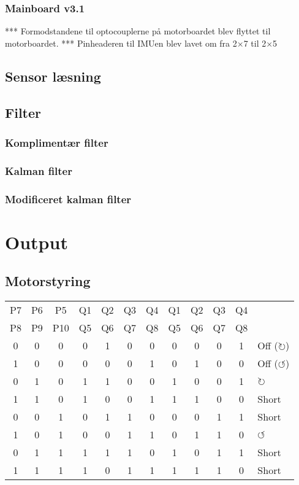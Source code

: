 \documentclass[a4paper,oneside,article,danish,table,draft]{memoir}
\begin{document}
\subsubsection{Mainboard v3.1}
*** Formodstandene til optocouplerne på motorboardet blev flyttet til motorboardet.
*** Pinheaderen til IMUen blev lavet om fra 2×7 til 2×5

\subsection{Sensor læsning}

\subsection{Filter}
\subsubsection{Komplimentær filter}
\subsubsection{Kalman filter}
\subsubsection{Modificeret kalman filter}

\section{Output}

\subsection{Motorstyring}
\begin{table}[htbp]
  \centering
  \begin{tabular}{ccc|cccc|ccccl}
      \toprule
     P7&P6&P5 &Q1&Q2&Q3&Q4 &Q1&Q2&Q3&Q4\\
     P8&P9&P10 &Q5&Q6&Q7&Q8 &Q5&Q6&Q7&Q8\\
     \midrule
     0&0&0 &0&1&0&0 &0&0&0&1 & Off ($\circlearrowright$)\\
     1&0&0 &0&0&0&1 &0&1&0&0 & Off ($\circlearrowleft$)\\
     0&1&0 &1&1&0&0 &1&0&0&1 & $\circlearrowright$\\
     1&1&0 &1&0&0&1 &1&1&0&0 & Short\\
     0&0&1 &0&1&1&0 &0&0&1&1 & Short\\
     1&0&1 &0&0&1&1 &0&1&1&0 & $\circlearrowleft$\\
     0&1&1 &1&1&1&0 &1&0&1&1 & Short\\
     1&1&1 &1&0&1&1 &1&1&1&0 & Short\\
    \end{tabular}
  \end{table}
\end{document}
